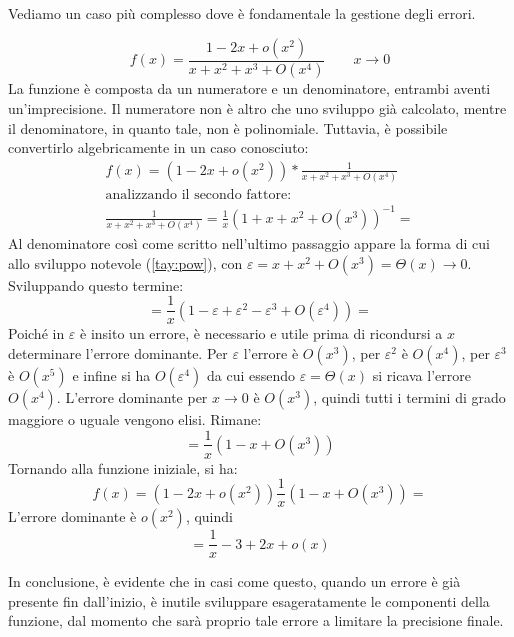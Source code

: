 Vediamo un caso più complesso dove è fondamentale la gestione degli errori.
\begin{examp}
	\[
		f(x)=\frac{1-2x+o(x^2)}{x+x^2+x^3+O(x^4)}\qquad{x\to0}
	\]
	La funzione è composta da un numeratore e un denominatore, entrambi aventi un'imprecisione. Il numeratore non è altro che uno sviluppo già calcolato, mentre il denominatore, in quanto tale, non è polinomiale. Tuttavia, è possibile convertirlo algebricamente in un caso conosciuto:
	\begin{gather*}
		f(x)=(1-2x+o(x^2))*\frac{1}{x+x^2+x^3+O(x^4)}\\
		\text{analizzando il secondo fattore:}\\
		\frac{1}{x+x^2+x^3+O(x^4)}=\frac{1}{x}(1+x+x^2+O(x^3))^{-1}=
	\end{gather*}
	Al denominatore così come scritto nell'ultimo passaggio appare la forma di cui allo sviluppo notevole (\ref{tay:pow}), con $\varepsilon=x+x^2+O(x^3)=\Theta(x)\to0$. Sviluppando questo termine:
	\[
		=\frac{1}{x}(1-\varepsilon+\varepsilon^2-\varepsilon^3+O(\varepsilon^4))=
	\]
	Poiché in $\varepsilon$ è insito un errore, è necessario e utile prima di ricondursi a $x$ determinare l'errore dominante. Per $\varepsilon$ l'errore è $O(x^3)$, per $\varepsilon^2$ è $O(x^4)$, per $\varepsilon^3$ è $O(x^5)$ e infine si ha $O(\varepsilon^4)$ da cui essendo $\varepsilon=\Theta(x)$ si ricava l'errore $O(x^4)$. L'errore dominante per $x\to0$ è $O(x^3)$, quindi tutti i termini di grado maggiore o uguale vengono elisi. Rimane:
	\[
		=\frac{1}{x}(1-x+O(x^3))
	\]
	Tornando alla funzione iniziale, si ha:
	\[
		f(x)=(1-2x+o(x^2))\frac{1}{x}(1-x+O(x^3))=
	\]
	L'errore dominante è $o(x^2)$, quindi
	\[
		=\frac{1}{x}-3+2x+o(x)
	\]

	In conclusione, è evidente che in casi come questo, quando un errore è già presente fin dall'inizio, è inutile sviluppare esageratamente le componenti della funzione, dal momento che sarà proprio tale errore a limitare la precisione finale.
\end{examp}
